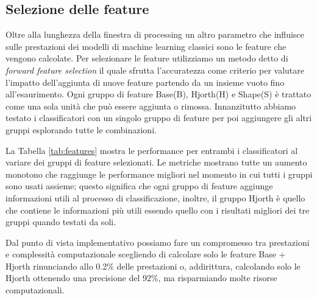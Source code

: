 \subsection{Selezione delle feature}
\label{ssec:selezione-delle-feature}

Oltre alla lunghezza della finestra di processing un altro parametro che influisce sulle prestazioni dei modelli di machine learning classici sono le feature che vengono calcolate. Per selezionare le feature utilizziamo un metodo detto di \textit{forward feature selection} il quale sfrutta l'accuratezza come criterio per valutare l'impatto dell'aggiunta di nuove feature partendo da un insieme vuoto fino all'esaurimento. Ogni gruppo di feature Base(B), Hjorth(H) e Shape(S) è trattato come una sola unità che può essere aggiunta o rimossa. Innanzitutto abbiamo testato i classificatori con un singolo gruppo di feature per poi aggiungere gli altri gruppi esplorando tutte le combinazioni.

La Tabella \ref{tab:features} mostra le performance per entrambi i classificatori al variare dei gruppi di feature selezionati. Le metriche mostrano tutte un aumento monotono che raggiunge le performance migliori nel momento in cui tutti i gruppi sono usati assieme; questo significa che ogni gruppo di feature aggiunge informazioni utili al processo di classificazione, inoltre, il gruppo Hjorth è quello che contiene le informazioni più utili essendo quello con  i risultati migliori dei tre gruppi quando testati da soli. 

Dal punto di vista implementativo possiamo fare un compromesso tra prestazioni e complessità computazionale scegliendo di calcolare solo le feature Base + Hjorth rinunciando allo 0.2\% delle prestazioni o, addirittura, calcolando solo le Hjorth ottenendo una precisione del 92\%, ma risparmiando molte risorse computazionali.

